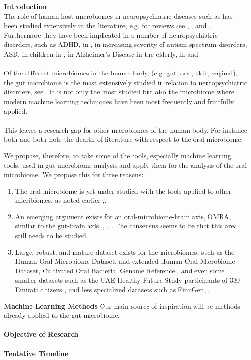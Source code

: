 \documentclass{article}
\begin{document}
\noindent
\textbf{Introduction}\\
The role of human host microbiomes in neuropsychiatric diseases such as has been studied extensively in the literature, e.g. for reviews see \cite{goswami_role_2021}, \cite{hashimoto_emerging_2023}, and \cite{bonnechere}. Furthermore they have been implicated in a number of neuropsychiatric disorders, such as ADHD, in \cite{bull-larsen_potential_2019}, in increasing severity of autism spectrum disorders, ASD, in children in \cite{TOMOVA2015179}, in Alzheimer's Disease in the elderly, in \cite{yk_microbiota-gut-brain_2018} and \cite{escobar_influence_2022}
\\~\\
Of the different microbiomes in the human body, (e.g. gut, oral, skin, vaginal), the gut microbiome is the most extensively studied in relation to neuropsychiatric disorders, see \cite{sorboni_comprehensive_2022}. It is not only the most studied but also the microbiome where modern machine learning techniques have been most frequently and fruitfully applied. 
\\~\\
This leaves a research gap for other microbiomes of the human body. For instance both \cite{goswami_role_2021} and \cite{tao_relationship_2024} both note the dearth of literature with respect to the oral microbiome. 

We propose, therefore, to take some of the tools, especially machine learning tools, used in gut microbiome analysis and apply them for the analysis of the oral microbiome. We propose this for three reasons:

\begin{enumerate}
	\item The oral microbiome is yet under-studied with the tools applied to other micribiomes, as noted earlier \cite{goswami_role_2021},\cite{tao_relationship_2024}.
	\item An emerging argument exists for an oral-microbiome-brain axis, OMBA, similar to the gut-brain axis, \cite{bowland_oral-microbiome-brain_2022}, \cite{xi_coming_2024}, \cite{y_did_2020}. The consensus seems to be that this area still needs to be studied.
	\item Large, robust, and mature dataset exists for the microbiomes, such as the Human Oral Microbiome Dataset, and extended Human Oral Microbiome Dataset\cite{homd}, Cultivated Oral Bacterial Genome Reference \cite{li_catalog_2023}, and even some smaller datasets such as the UAE Healthy Future Study participants of 330 Emirati citizens \cite{noauthor_human_nodate}, and less specialized datasets such as FinnGen, \cite{noauthor_finngen_nodate}.
\end{enumerate}
\textbf{Machine Learning Methods} 
Our main source of inspiration will be methods already applied to the gut microbiome. 
\\~\\

\textbf{Objective of Research}
\\~\\
\textbf{Tentative Timeline}


\end{document}
